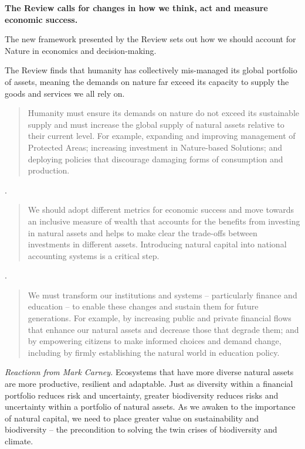\documentclass[
]{book}
\begin{document}
\textbf{The Review calls for changes in how we think, act and measure economic success.}

The new framework presented by the Review sets out
how we should account for Nature in economics and decision-making.

The Review finds that humanity has collectively mis-managed its global portfolio of assets,
meaning the demands on nature far exceed its capacity to supply the goods and services
we all rely on.

\begin{quote}
Humanity must ensure its demands on nature do not exceed its sustainable supply and must increase the global supply of natural assets relative to their current level. For example, expanding and improving management of Protected Areas; increasing investment in Nature-based Solutions; and deploying policies that discourage damaging forms of consumption and production.
\end{quote}

.

\begin{quote}
We should adopt different metrics for economic success and move towards an inclusive measure of wealth that accounts for the benefits from investing in natural assets and helps to make clear the trade-offs between investments in different assets. Introducing natural capital into national accounting systems is a critical step.
\end{quote}

.

\begin{quote}
We must transform our institutions and systems -- particularly finance and education -- to enable these changes and sustain them for future generations. For example, by increasing public and private financial flows that enhance our natural assets and decrease those that degrade them; and by empowering citizens to make informed choices and demand change, including by firmly establishing the natural world in education policy.
\end{quote}

\emph{Reactionn from Mark Carney.}
Ecosystems that have more diverse natural assets are more productive, resilient and adaptable. Just as diversity within a financial portfolio reduces risk and uncertainty, greater biodiversity reduces risks and uncertainty within a portfolio of natural assets. As we awaken to the importance of natural capital, we need to place greater value on sustainability and biodiversity -- the precondition to solving the twin crises of biodiversity and climate.
\end{document}

